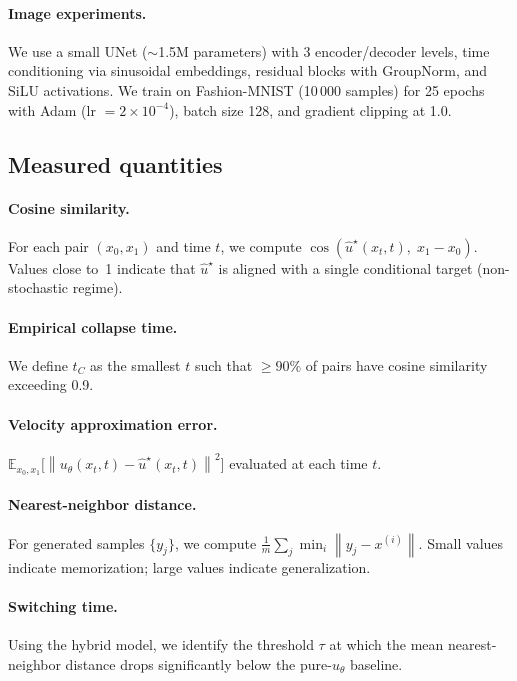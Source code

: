 \documentclass[10pt,a4paper]{article}
\theoremstyle{definition}
\newcommand{\E}{\mathbb{E}}
\newcommand{\norm}[1]{\left\lVert #1 \right\rVert}
\begin{document}
\paragraph{Image experiments.}
We use a small UNet ($\sim$1.5M parameters) with 3 encoder/decoder levels, time conditioning via sinusoidal embeddings, residual blocks with GroupNorm, and SiLU activations.
We train on Fashion-MNIST (10\,000 samples) for 25 epochs with Adam (lr $= 2 \times 10^{-4}$), batch size 128, and gradient clipping at 1.0.

\subsection{Measured quantities}\label{subsec:quantities}

\paragraph{Cosine similarity.}
For each pair $(x_0, x_1)$ and time $t$, we compute $\cos(\hat{u}^\star(x_t, t),\; x_1 - x_0)$.
Values close to~1 indicate that $\hat{u}^\star$ is aligned with a single conditional target (non-stochastic regime).

\paragraph{Empirical collapse time.}
We define $t_C$ as the smallest $t$ such that $\geq 90\%$ of pairs have cosine similarity exceeding 0.9.

\paragraph{Velocity approximation error.}
$\E_{x_0, x_1}\!\big[\norm{u_\theta(x_t, t) - \hat{u}^\star(x_t, t)}^2\big]$ evaluated at each time $t$.

\paragraph{Nearest-neighbor distance.}
For generated samples $\{y_j\}$, we compute $\frac{1}{m}\sum_j \min_i \norm{y_j - x^{(i)}}$.
Small values indicate memorization; large values indicate generalization.

\paragraph{Switching time.}
Using the hybrid model, we identify the threshold $\tau$ at which the mean nearest-neighbor distance drops significantly below the pure-$u_\theta$ baseline.
\end{document}
